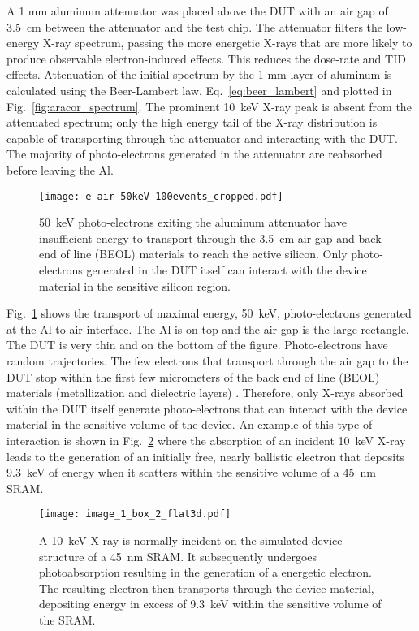 A 1 mm aluminum attenuator was placed above the DUT with an air gap of 3.5~cm between the attenuator and the test chip.
The attenuator filters the low-energy X-ray spectrum, passing the more energetic X-rays that are more likely to produce observable electron-induced effects. 
This reduces the dose-rate and TID effects. 
Attenuation of the initial spectrum by the 1 mm layer of aluminum is calculated using the Beer-Lambert law, Eq.~\ref{eq:beer_lambert} and plotted in Fig.~\ref{fig:aracor_spectrum}.
The prominent 10~keV X-ray peak is absent from the attenuated spectrum; only the high energy tail of the X-ray distribution is capable of transporting through the attenuator and interacting with the DUT.
The majority of photo-electrons generated in the attenuator are reabsorbed before leaving the Al.

\begin{figure}[tb]
    \begin{center}
        \texttt{[image: e-air-50keV-100events\_cropped.pdf]}
    \end{center}
    \caption{50~keV photo-electrons exiting the aluminum attenuator have insufficient energy to transport through the 3.5~cm air gap and back end of line (BEOL) materials to reach the active silicon. Only photo-electrons generated in the DUT itself can interact with the device material in the sensitive silicon region.}
    \label{fig:air_gap}
\end{figure}

Fig.~\ref{fig:air_gap} shows the transport of maximal energy, 50~keV, photo-electrons generated at the Al-to-air interface. 
The Al is on top and the air gap is the large rectangle.
The DUT is very thin and on the bottom of the figure.
Photo-electrons have random trajectories. 
The few electrons that transport through the air gap to the DUT stop within the first few micrometers of the back end of line (BEOL) materials (metallization and dielectric layers) \cite{Dasgupta:2011mg}.
Therefore, only X-rays absorbed within the DUT itself generate photo-electrons that can interact with the device material in the sensitive volume of the device.
An example of this type of interaction is shown in Fig.~\ref{fig:photoabsorption_opendx} where the absorption of an incident 10~keV X-ray leads to the generation of an initially free, nearly ballistic electron that deposits 9.3~keV of energy when it scatters within the sensitive volume of a 45~nm SRAM.

\begin{figure}[htbp]
    \centering
        \texttt{[image: image\_1\_box\_2\_flat3d.pdf]}
        \caption{A 10~keV X-ray is normally incident on the simulated device structure of a 45~nm SRAM. It subsequently undergoes photoabsorption resulting in the generation of a energetic electron. The resulting electron then transports through the device material, depositing energy in excess of 9.3~keV within the sensitive volume of the SRAM.}
        \label{fig:photoabsorption_opendx}
\end{figure}


